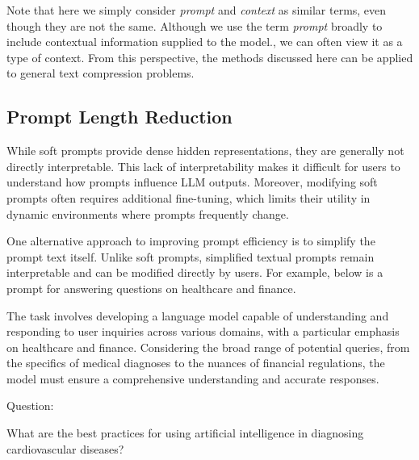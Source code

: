 Note that here we simply consider \textit{prompt} and \textit{context} as similar terms, even though they are not the same. Although we use the term \textit{prompt} broadly to include contextual information supplied to the model., we can often view it as a type of context. From this perspective, the methods discussed here can be applied to general text compression problems.

\subsection{Prompt Length Reduction}

While soft prompts provide dense hidden representations, they are generally not directly interpretable. This lack of interpretability makes it difficult for users to understand how prompts influence LLM outputs. Moreover, modifying soft prompts often requires additional fine-tuning, which limits their utility in dynamic environments where prompts frequently change.

One alternative approach to improving prompt efficiency is to simplify the prompt text itself. Unlike soft prompts, simplified textual prompts remain interpretable and can be modified directly by users. For example, below is a prompt for answering questions on healthcare and finance.

\vspace{0.5em}
\begin{tcolorbox}

\begingroup
\setlength{\leftskip}{2em}
\setlength{\rightskip}{2em}

The task involves developing a language model capable of understanding and responding to user inquiries across various domains, with a particular emphasis on healthcare and finance. Considering the broad range of potential queries, from the specifics of medical diagnoses to the nuances of financial regulations, the model must ensure a comprehensive understanding and accurate responses.

\vspace{0.5em}

Question:

\vspace{0.2em}

What are the best practices for using artificial intelligence in diagnosing cardiovascular diseases?

\vspace{0.5em}

\underline{\hspace{2em}}

\endgroup

\end{tcolorbox}
\vspace{0.5em}

